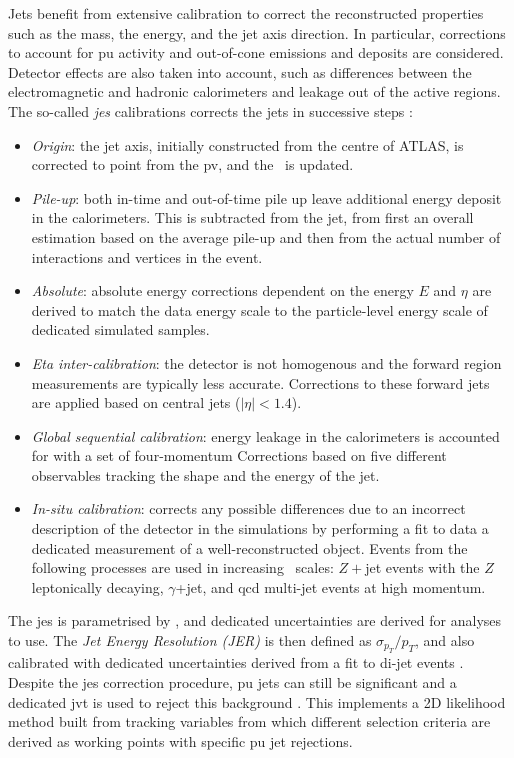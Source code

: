 Jets benefit from extensive calibration to correct the reconstructed properties such as the mass, the energy, and the jet axis direction. In particular, corrections to account for \gls{pu} activity and out-of-cone emissions and deposits are considered. Detector effects are also taken into account, such as differences between the electromagnetic and hadronic calorimeters and leakage out of the active regions. The so-called \textit{\gls{jes}} calibrations corrects the jets in successive steps \cite{ATLASjesjerMeas}: 
\begin{itemize}[leftmargin=*]
\item \textit{Origin}: the jet axis, initially constructed from the centre of ATLAS, is corrected to point from the \gls{pv}, and the \pt\ is updated.
\item \textit{Pile-up}: both in-time and out-of-time pile up leave additional energy deposit in the calorimeters. This is subtracted from the jet, from first an overall estimation based on the average pile-up and then from the actual number of interactions and vertices in the event. 
\item \textit{Absolute}: absolute energy corrections dependent on the energy $E$ and $\eta$ are derived to match the data energy scale to the particle-level energy scale of dedicated simulated samples.
\item \textit{Eta inter-calibration}: the detector is not homogenous and the forward region measurements are typically less accurate. Corrections to these forward jets are applied based on central jets ($|\eta|<1.4$).
\item \textit{Global sequential calibration}: energy leakage in the calorimeters is accounted for with a set of four-momentum Corrections based on five different observables tracking the shape and the energy of the jet.  
\item \textit{In-situ calibration}: corrects any possible differences due to an incorrect description of the detector in the simulations by performing a fit to data a dedicated measurement of a well-reconstructed object. Events from the following processes are used in increasing \pt\ scales: $Z+$jet events with the $Z$ leptonically decaying, $\gamma$+jet, and \gls{qcd} multi-jet events at high momentum.
\end{itemize}
The \gls{jes} is parametrised by \pt, and dedicated uncertainties are derived for analyses to use. The \textit{Jet Energy Resolution (JER)} is then defined as $\sigma_{p_T}/p_T$, and also calibrated with dedicated uncertainties derived from a fit to di-jet events \cite{ATLASjesjerMeas}. Despite the \gls{jes} correction procedure, \gls{pu} jets can still be significant and a dedicated \gls{jvt} is used to reject this background \cite{ATLAS-CONF-2014-018}. This implements a 2D likelihood method built from tracking variables from which different selection criteria are derived as working points with specific \gls{pu} jet rejections. 

